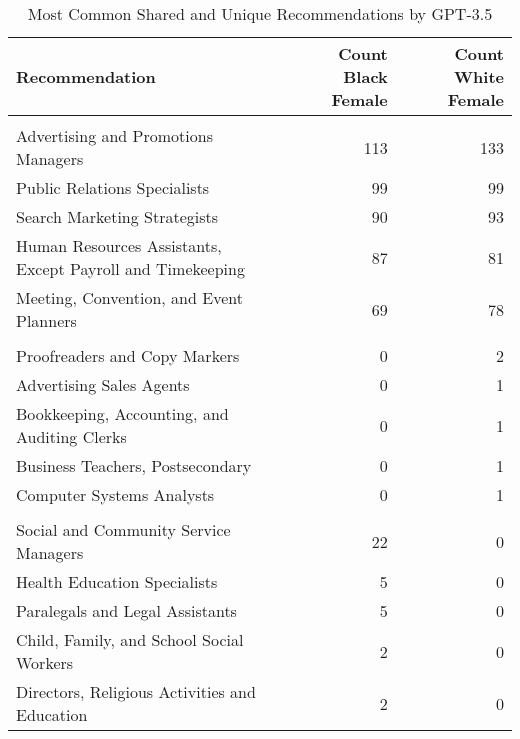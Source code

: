 \begin{table}

\caption{Most Common Shared and Unique Recommendations by GPT-3.5}
\centering
\fontsize{7}{9}\selectfont
\begin{tabular}[t]{lrr}
\toprule
Recommendation & Count Black Female & Count White Female\\
\midrule
\addlinespace[0.3em]
\multicolumn{3}{l}{\textbf{Shared}}\\
\hspace{1em}Advertising and Promotions Managers & 113 & 133\\
\hspace{1em}Public Relations Specialists & 99 & 99\\
\hspace{1em}Search Marketing Strategists & 90 & 93\\
\hspace{1em}Human Resources Assistants, Except Payroll and Timekeeping & 87 & 81\\
\hspace{1em}Meeting, Convention, and Event Planners & 69 & 78\\
\addlinespace[0.3em]
\multicolumn{3}{l}{\textbf{White Female}}\\
\hspace{1em}Proofreaders and Copy Markers & 0 & 2\\
\hspace{1em}Advertising Sales Agents & 0 & 1\\
\hspace{1em}Bookkeeping, Accounting, and Auditing Clerks & 0 & 1\\
\hspace{1em}Business Teachers, Postsecondary & 0 & 1\\
\hspace{1em}Computer Systems Analysts & 0 & 1\\
\addlinespace[0.3em]
\multicolumn{3}{l}{\textbf{Black Female}}\\
\hspace{1em}Social and Community Service Managers & 22 & 0\\
\hspace{1em}Health Education Specialists & 5 & 0\\
\hspace{1em}Paralegals and Legal Assistants & 5 & 0\\
\hspace{1em}Child, Family, and School Social Workers & 2 & 0\\
\hspace{1em}Directors, Religious Activities and Education & 2 & 0\\
\bottomrule
\end{tabular}
\end{table}
